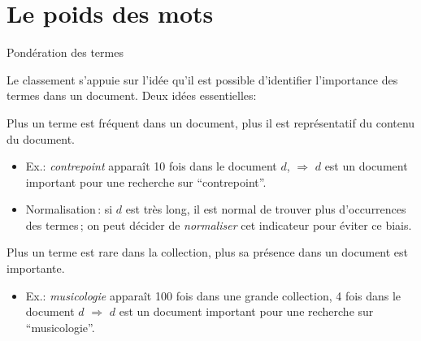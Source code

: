

\section{Le poids des mots}

\begin{frame}{Pondération des termes}

Le classement s'appuie sur l'idée qu'il est possible 
d'identifier \alert{l'importance des termes} dans un document. Deux
idées essentielles:

\vfill

Plus un terme est \alert{fréquent dans un document}, plus il est représentatif du contenu du document.

\begin{itemize}
   \item Ex.: \emph{contrepoint} apparaît 10 fois dans le document $d$, $\Rightarrow$ $d$
      est un document important pour une recherche sur ``contrepoint''.
      \item \alert{Normalisation}\,: si $d$ est très long, il est normal de trouver plus d'occurrences
         des termes\,; on peut décider de \emph{normaliser} cet indicateur pour éviter ce biais.
\end{itemize}

\vfill

Plus un terme est \alert{rare dans la collection}, plus sa présence dans un document est importante.

\begin{itemize}
   \item Ex.: \emph{musicologie} apparaît 100 fois dans une grande collection, 4 fois dans le document $d$ $\Rightarrow$ $d$
      est un document important pour une recherche sur ``musicologie''.
\end{itemize}

\end{frame}


